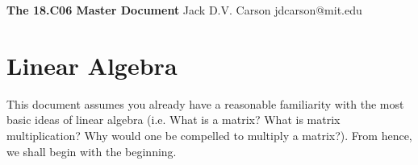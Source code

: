 \documentclass[11pt]{article}
\begin{document}
\thispagestyle{empty}
\bigskip 
\vspace{0.1cm}

\begin{center}
		{\fontsize{20}{20} \selectfont \bf \sffamily The 18.C06 Master Document}
	\vskip 12pt
		{\fontsize{18}{18} \selectfont \rmfamily Jack D.V. Carson}
	\vskip 6pt
		{\fontsize{14}{14} \selectfont \ttfamily jdcarson@mit.edu}
	\vskip 24pt
\end{center}


\microtoc
\section{Linear Algebra}
This document assumes you already have a reasonable familiarity with the most basic ideas of linear algebra (i.e. What is a matrix? What is matrix multiplication? Why would one be compelled to multiply a matrix?). From hence, we shall begin with the beginning.
\end{document}

